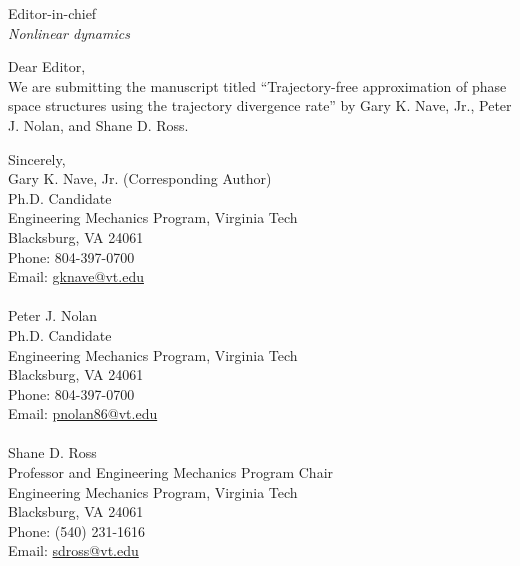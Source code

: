 \documentclass{letter}
\begin{document}
	Editor-in-chief \\
	\textit{Nonlinear dynamics}
	
	Dear Editor, \\
	We are submitting the manuscript titled ``Trajectory-free approximation of phase space structures using the trajectory divergence rate'' by Gary K. Nave, Jr., Peter J. Nolan, and Shane D. Ross. %
	
	
	Sincerely, \\
	Gary K. Nave, Jr. (Corresponding Author) \\
	Ph.D. Candidate \\
	Engineering Mechanics Program, Virginia Tech \\
	Blacksburg, VA 24061 \\
	Phone: 804-397-0700 \\
	Email: \href{mailto:gknave@vt.edu}{gknave@vt.edu} \\ \\
	Peter J. Nolan \\
	Ph.D. Candidate \\
	Engineering Mechanics Program, Virginia Tech \\
	Blacksburg, VA 24061 \\
	Phone: 804-397-0700 \\
	Email: \href{mailto:pnolan86@vt.edu}{pnolan86@vt.edu} \\ \\
	Shane D. Ross \\
	Professor and Engineering Mechanics Program Chair \\
	Engineering Mechanics Program, Virginia Tech \\
	Blacksburg, VA 24061 \\
	Phone: (540) 231-1616 \\
	Email: \href{mailto:sdross@vt.edu}{sdross@vt.edu}
\end{document}

